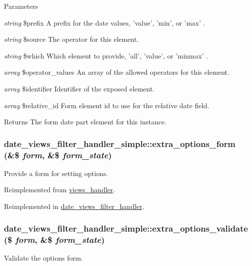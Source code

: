 \begin{DoxyParams}{Parameters}
\item[{\em string}]\$prefix A prefix for the date values, 'value', 'min', or 'max' . \item[{\em string}]\$source The operator for this element. \item[{\em string}]\$which Which element to provide, 'all', 'value', or 'minmax' . \item[{\em array}]\$operator\_\-values An array of the allowed operators for this element. \item[{\em array}]\$identifier Identifier of the exposed element. \item[{\em array}]\$relative\_\-id Form element id to use for the relative date field.\end{DoxyParams}
\begin{DoxyReturn}{Returns}
The form date part element for this instance. 
\end{DoxyReturn}
\hypertarget{classdate__views__filter__handler__simple_aec14000e6f8d47bbb7c3dd0138a10c59}{
\subsubsection[{extra\_\-options\_\-form}]{\setlength{\rightskip}{0pt plus 5cm}date\_\-views\_\-filter\_\-handler\_\-simple::extra\_\-options\_\-form (\&\$ {\em form}, \/  \&\$ {\em form\_\-state})}}
\label{classdate__views__filter__handler__simple_aec14000e6f8d47bbb7c3dd0138a10c59}
Provide a form for setting options. 

Reimplemented from \hyperlink{classviews__handler_a0eed1d12c47d60190f59e135d962719e}{views\_\-handler}.

Reimplemented in \hyperlink{classdate__views__filter__handler_a17b0b4b30f8c2bcb368bbb6fd9eabcd1}{date\_\-views\_\-filter\_\-handler}.\hypertarget{classdate__views__filter__handler__simple_a3b294398f9130f76fbf3144bf2120a63}{
\subsubsection[{extra\_\-options\_\-validate}]{\setlength{\rightskip}{0pt plus 5cm}date\_\-views\_\-filter\_\-handler\_\-simple::extra\_\-options\_\-validate (\$ {\em form}, \/  \&\$ {\em form\_\-state})}}
\label{classdate__views__filter__handler__simple_a3b294398f9130f76fbf3144bf2120a63}
Validate the options form. 

